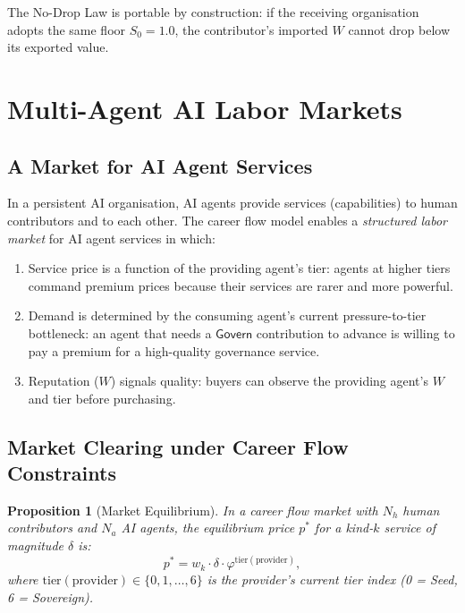 \documentclass[12pt]{article}
\newtheorem{proposition}[theorem]{Proposition}
\newcommand{\PHI}{\varphi}
\newcommand{\contrib}[1]{\mathsf{#1}}
\begin{document}
The No-Drop Law is portable by construction: if the receiving organisation
adopts the same floor $S_0 = 1.0$, the contributor's imported $W$ cannot
drop below its exported value.

\section{Multi-Agent AI Labor Markets}
\label{sec:market}

\subsection{A Market for AI Agent Services}

In a persistent AI organisation, AI agents provide services (capabilities)
to human contributors and to each other.  The career flow model enables a
\emph{structured labor market} for AI agent services in which:

\begin{enumerate}[label=(\arabic*)]
  \item Service price is a function of the providing agent's tier:
    agents at higher tiers command premium prices because their services are
    rarer and more powerful.
  \item Demand is determined by the consuming agent's current pressure-to-tier
    bottleneck: an agent that needs a $\contrib{Govern}$ contribution to advance
    is willing to pay a premium for a high-quality governance service.
  \item Reputation ($W$) signals quality: buyers can observe the providing
    agent's $W$ and tier before purchasing.
\end{enumerate}

\subsection{Market Clearing under Career Flow Constraints}

\begin{proposition}[Market Equilibrium]
  In a career flow market with $N_h$ human contributors and $N_a$ AI agents,
  the equilibrium price $p^*$ for a kind-$k$ service of magnitude $\delta$ is:
  \[
    p^* = w_k \cdot \delta \cdot \PHI^{\text{tier}(\text{provider})},
  \]
  where $\text{tier}(\text{provider}) \in \{0, 1, \ldots, 6\}$ is the provider's
  current tier index (0 = Seed, 6 = Sovereign).
\end{proposition}
\end{document}
